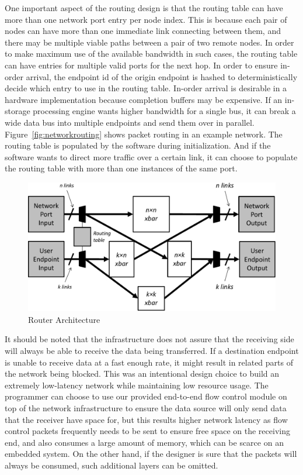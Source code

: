 One important aspect of the routing design is that the routing table can have
more than one network port entry per node index. This is because each pair of
nodes can have more than one immediate link connecting between them, and there may be
multiple viable paths between a pair of two remote nodes. In order to make
maximum use of the available bandwidth in such cases, the routing table can have
entries for multiple valid ports for the next hop. In order to ensure in-order
arrival, the endpoint id of the origin endpoint is hashed to deterministically
decide which entry to use in the routing table. In-order arrival is desirable in
a hardware implementation because completion buffers may be expensive. If an
in-storage processing engine wants higher bandwidth for a single bus, it can
break a wide data bus into multiple endpoints and send them over in parallel.
Figure~\ref{fig:networkrouting} shows packet routing in an example network.
The routing table is populated by the software during initialization. And if the
software wants to direct more traffic over a certain link, it can choose to
populate the routing table with more than one instances of the same port.


\begin{figure}[h]
	\begin{center}
	\includegraphics[scale=0.4]{figures/network-routing-crop.pdf}
	\caption{Router Architecture}
	\label{fig:networkinterface}
	\end{center}
\end{figure}

It should be noted that the infrastructure does not assure that the receiving
side will always be able to receive the data being transferred. If a destination
endpoint is unable to receive data at a fast enough rate, it might result in
related parts of the network being blocked. This was an intentional design
choice to build an extremely low-latency network while maintaining low resource
usage. The programmer can choose to use our provided end-to-end flow control
module on top of the network infrastructure to ensure the data source will only
send data that the receiver have space for, but this results higher network
latency as flow control packets frequently needs to be sent to ensure free space
on the receiving end, and also consumes a large amount of memory, which can be
scarce on an embedded system.  On the other hand, if the designer is sure that
the packets will always be consumed, such additional layers can be omitted. 

